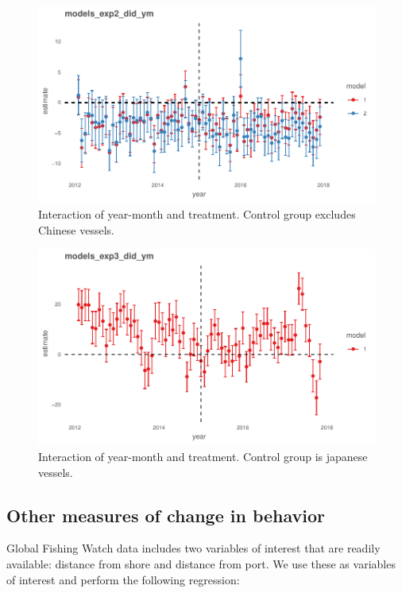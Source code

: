 \documentclass[11pt,english]{article}
\begin{document}
\begin{figure}
\centering
\includegraphics{Manuscript_files/figure-latex/unnamed-chunk-26-1.pdf}
\caption{\label{fig:unnamed-chunk-26}\label{fig:ym3}Interaction of
year-month and treatment. Control group excludes Chinese vessels.}
\end{figure}

\begin{figure}
\centering
\includegraphics{Manuscript_files/figure-latex/unnamed-chunk-27-1.pdf}
\caption{\label{fig:unnamed-chunk-27}\label{fig:ym4}Interaction of
year-month and treatment. Control group is japanese vessels.}
\end{figure}

\hypertarget{other-measures-of-change-in-behavior}{%
\subsection{Other measures of change in
behavior}\label{other-measures-of-change-in-behavior}}

Global Fishing Watch data includes two variables of interest that are
readily available: distance from shore and distance from port. We use
these as variables of interest and perform the following regression:
\end{document}
